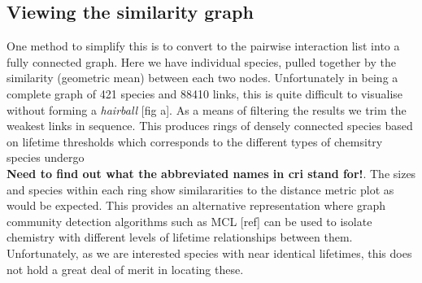 \documentclass{pasa}%
\begin{document}
\subsection{Viewing the similarity graph}

One method to simplify this is to convert to the pairwise interaction list into a fully connected graph. Here we have individual species, pulled together by the similarity (geometric mean) between each two nodes.
Unfortunately in being a complete graph of  421 species and 88410 links, this is quite difficult to visualise without forming a \emph{hairball} [fig a]. As a means of filtering the results we trim the weakest links in sequence. This produces rings of densely connected species based on lifetime thresholds which corresponds to the different types of chemsitry species undergo \\



\textbf{Need to find out what the abbreviated names in cri stand for!}. The sizes and species within each ring show similararities to the distance metric plot as would be expected. This provides an alternative representation where graph community detection algorithms such as MCL [ref] can be used to isolate chemistry with different levels of lifetime relationships between them. Unfortunately, as we are interested species with near identical lifetimes, this does not hold a great deal of merit in locating these. 
\end{document}
